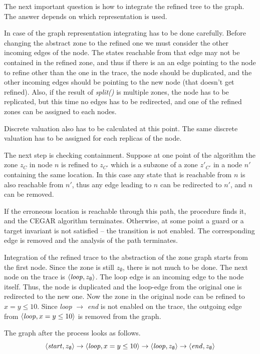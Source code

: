 The next important question is how to integrate the refined tree to the graph. The answer depends on which representation is used.

In case of the graph representation integrating has to be done carefully. Before changing the abstract zone to the refined one we must consider the other incoming edges of the node. The states reachable from that edge may not be contained in the refined zone, and thus if there is an an edge pointing to the node to refine other than the one in the trace, the node should be duplicated, and the other incoming edges should be pointing to the new node (that doesn't get refined). Also, if the result of \emph{split()} is multiple zones, the node has to be replicated, but this time no edges has to be redirected, and one of the refined zones can be assigned to each nodes.

Discrete valuation also has to be calculated at this point. The same discrete valuation has to be assigned for each replicas of the node.

The next step is checking containment. Suppose at one point of the
algorithm the zone $z_{C}$ in node $n$ %
 is 
refined to  $z_{C'}$ which is a
subzone of a zone $z'_{C'}$ in a node $n'$ containing the same location. In this case any state that is reachable from $n$ is also reachable from $n'$, thus any edge leading to  $n$ can be redirected to $n'$, and $n$ can be removed.

If the erroneous location is reachable through this path, the procedure finds it,
and the CEGAR algorithm terminates. Otherwise, at some point a guard or a target invariant
is not satisfied -- the transition is not enabled. The corresponding edge is removed and the analysis of the path terminates.

\begin{runningExample}
	Integration of the refined trace to the abstraction of the zone graph starts from the first node. Since the zone is still $z_\emptyset$, there is not much to be done. The next node on the trace is $\langle \text{\emph{loop}}, z_\emptyset \rangle$. The loop edge is an incoming edge to the node itself. Thus, the node is duplicated and the loop-edge from the original one is redirected to the new one. Now the zone in the original node can be refined to $x=y \leq 10$. Since \emph{loop} $\to$ \emph{end} is not enabled on the trace, the outgoing edge from $\langle \text{\emph{loop}}, x=y \leq 10 \rangle$ is removed from the graph.
	
	The graph after the process looks as follows.
	\[\langle \text{\emph{start}}, z_\emptyset \rangle \to \langle \text{\emph{loop}}, x=y \leq 10 \rangle \to \langle \text{\emph{loop}}, z_\emptyset \rangle \to \langle \text{\emph{end}}, z_\emptyset \rangle\]
\end{runningExample}

